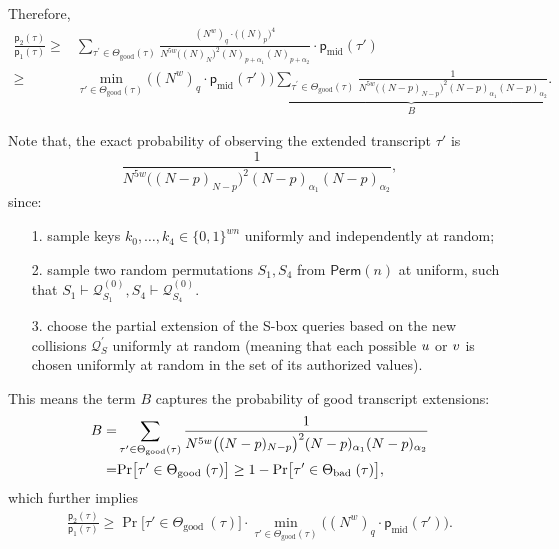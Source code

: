 \documentclass[journal=tosc,final,nohyperref]{iacrtrans}
\begin{document}
%
%
Therefore,
%
%
\begin{align*}
\frac{\mathsf{p}_{2}(\tau)}{\mathsf{p}_{1}(\tau)}   \geq  &
\sum_{\tau^{\prime} \in \Theta_{\mathrm{good}}(\tau)}
\frac{(N^w)_q\cdot\big((N)_p\big)^4}{N^{5w}\big((N)_{N}\big)^2(N)_{p+\alpha_1}(N)_{p+\alpha_2}}\cdot \mathsf{p}_{\mathrm{mid}}(\tau')         \\
\geq  &    \min_{\tau' \in \Theta_{\mathrm{good}}(\tau)}\big((N^w)_q\cdot\mathsf{p}_{\mathrm{mid}}(\tau')\big)
\underbrace{\sum_{\tau^{\prime} \in \Theta_{\mathrm{good}}(\tau)}
	\frac{1}{N^{5w}\big((N-p)_{N-p}\big)^2(N-p)_{\alpha_1}(N-p)_{\alpha_2}}}_{B} .
\end{align*}



Note that, the exact probability of observing the extended transcript $\tau'$ is
%
%
$$\frac{1}{N^{5w}\big((N-p)_{N-p}\big)^2(N-p)_{\alpha_1}(N-p)_{\alpha_2}},$$
%
since:
%
\begin{itemize}
	\item[1.] sample keys $k_0,\ldots,k_4\in\{0,1\}^{wn}$ uniformly and independently at random;
	\item[2.] sample two random permutations $S_1,S_4$ from $\mathsf{Perm}(n)$ at uniform, such that $S_1\vdash\mathcal{Q}_{S_1}^{(0)},S_4\vdash\mathcal{Q}_{S_4}^{(0)}$.
	\item[3.] choose the partial extension of the S-box queries based on the new collisions $\mathcal{Q}_{S}^{\prime}$ uniformly at random (meaning that each possible $\mathnormal{u}$ or $\mathnormal{v}$ is chosen uniformly at random in the set of its authorized values).
\end{itemize}
%
%
This means the term $B$ captures the probability of good transcript extensions:
%
%
\begin{align}
B=&\sum_{\tau^{\prime} \in \Theta_{\mathrm{good}}(\tau)}
\frac{1}{N^{5w}\big((N-p)_{N-p}\big)^2(N-p)_{\alpha_1}(N-p)_{\alpha_2}}  \notag   \\
=&{\Pr}\big[ \tau' \in \Theta_{\text {good }}(\tau)\big] \geq  1- {\Pr}\big[ \tau' \in \Theta_{\text {bad }}(\tau)\big],   \notag
\end{align}
%
%
which further implies
%
%
\begin{align}
\frac{\mathsf{p}_{2}(\tau)}{\mathsf{p}_{1}(\tau)}   \geq  {\Pr}\big[ \tau' \in \Theta_{\text {good }}(\tau)\big]\cdot
\min_{\tau' \in \Theta_{\mathrm{good}}(\tau)}\big((N^w)_q\cdot\mathsf{p}_{\mathrm{mid}}(\tau')\big). 
\label{eq:ratio-divide-4-rounds}
\end{align}
%
%
\end{document}
